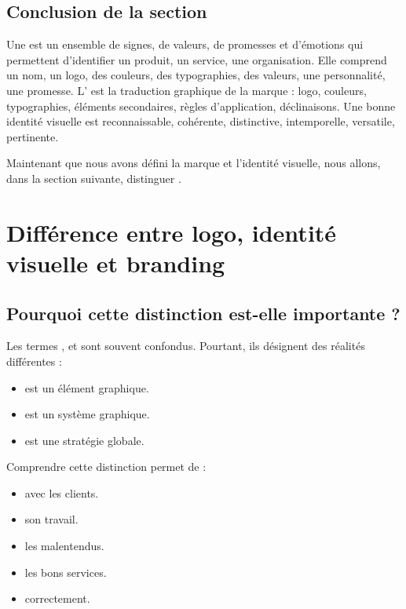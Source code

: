 \subsection*{Conclusion de la section}

Une  est un ensemble de signes, de valeurs, de promesses et d'émotions qui permettent d'identifier un produit, un service, une organisation. Elle comprend un nom, un logo, des couleurs, des typographies, des valeurs, une personnalité, une promesse. L' est la traduction graphique de la marque : logo, couleurs, typographies, éléments secondaires, règles d'application, déclinaisons. Une bonne identité visuelle est reconnaissable, cohérente, distinctive, intemporelle, versatile, pertinente.

Maintenant que nous avons défini la marque et l'identité visuelle, nous allons, dans la section suivante, distinguer .

\section{Différence entre logo, identité visuelle et branding}

\subsection{Pourquoi cette distinction est-elle importante ?}

Les termes ,  et  sont souvent confondus. Pourtant, ils désignent des réalités différentes :

\begin{itemize}
    \item {} est un élément graphique.
    \item {} est un système graphique.
    \item {} est une stratégie globale.
\end{itemize}

Comprendre cette distinction permet de :

\begin{itemize}
    \item {} avec les clients.
    \item {} son travail.
    \item {} les malentendus.
    \item {} les bons services.
    \item {} correctement.
\end{itemize}

